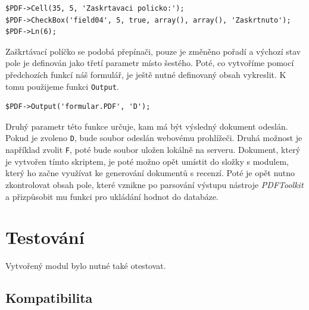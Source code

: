 \documentclass[czech,BP]{thesiskiv}
\begin{document}
\begin{lstlisting}[firstnumber=25]
$PDF->Cell(35, 5, 'Zaskrtavaci policko:');
$PDF->CheckBox('field04', 5, true, array(), array(), 'Zaskrtnuto');
$PDF->Ln(6);
\end{lstlisting}
Zaškrtávací políčko se podobá přepínači, pouze je změněno pořadí a výchozí stav pole je definován jako třetí parametr místo šestého. Poté, co vytvoříme pomocí předchozích funkcí náš formulář, je ještě nutné definovaný obsah vykreslit. K tomu použijeme funkci \texttt{Output}.
\begin{lstlisting}[firstnumber=28]
$PDF->Output('formular.PDF', 'D');
\end{lstlisting}
Druhý parametr této funkce určuje, kam má být výsledný dokument odeslán. Pokud je zvoleno \texttt{D}, bude soubor odeslán webovému prohlížeči. Druhá možnost je například zvolit \texttt{F}, poté bude soubor uložen lokálně na serveru.
Dokument, který je vytvořen tímto skriptem, je poté možno opět umístit do složky s modulem, který ho začne využívat ke generování dokumentů s recenzí. Poté je opět nutno zkontrolovat obsah pole, které vznikne po parsování výstupu nástroje \emph{PDFToolkit} a přizpůsobit mu funkci pro ukládání hodnot do databáze.
\chapter{Testování}
Vytvořený modul bylo nutné také otestovat. 
\section{Kompatibilita}
\end{document}
